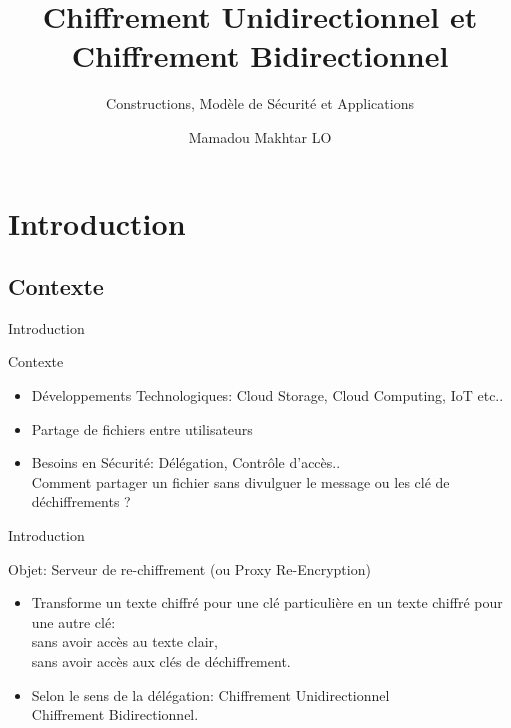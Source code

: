 \documentclass{beamer}
\title{Chiffrement Unidirectionnel et Chiffrement Bidirectionnel}
\subtitle{Constructions, Modèle de Sécurité et Applications}
\author{Mamadou Makhtar LO}
\begin{document}
\begin{frame}[plain]
    \maketitle
\end{frame}
\begin{frame}[plain]
	\tableofcontents
\end{frame}
\section{Introduction}
\subsection{Contexte}

\begin{frame}{Introduction}
	\begin{block}{Contexte}
	\begin{itemize}
		\item Développements Technologiques: Cloud Storage, Cloud Computing, IoT etc.. \pause
		\item Partage de fichiers entre utilisateurs \pause
		\item Besoins en Sécurité: Délégation, Contrôle d'accès..\\ \pause
		Comment partager un fichier sans divulguer le message ou les clé de déchiffrements ? 
	\end{itemize}
\end{block}
\end{frame}

\begin{frame}{Introduction}
	\begin{block}{Objet:}
		Serveur de re-chiffrement (ou Proxy Re-Encryption)\pause
		\begin{itemize}
			\item Transforme un texte chiffré pour une clé particulière en un texte chiffré pour une autre clé:\\ \pause
			sans avoir accès au texte clair,\\ \pause
			sans avoir accès aux clés de déchiffrement. \pause
			\item Selon le sens de la délégation: \pause
			Chiffrement Unidirectionnel\\ \pause
			Chiffrement Bidirectionnel. \pause
		\end{itemize}
		
	\end{block}
\end{frame}
\end{document}
